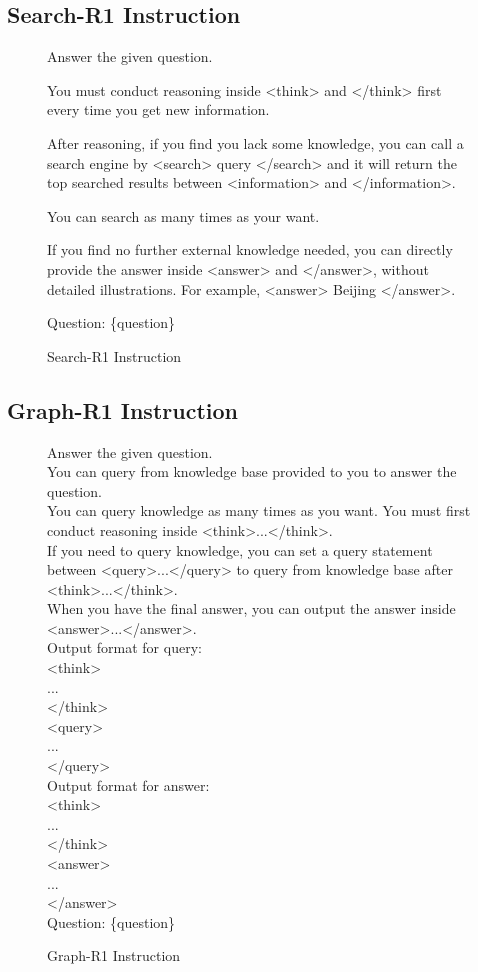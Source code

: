 \subsection{Search-R1 Instruction}
\begin{figure}[t]
\centering
\begin{tcolorbox}[mygraybox, width=\textwidth, title={Search-R1 Instruction}]
Answer the given question.

You must conduct reasoning inside <think> and </think> first every time you get new information.

After reasoning, if you find you lack some knowledge, you can call a search engine by <search> query </search> and it will return the top searched results between <information> and </information>.

You can search as many times as your want.

If you find no further external knowledge needed, you can directly provide the answer inside <answer> and </answer>, without detailed illustrations. For example, <answer> Beijing </answer>. 

Question: \{question\}
\end{tcolorbox}
\caption{Search-R1 Instruction}
\end{figure}

\subsection{Graph-R1 Instruction}
\begin{figure}[t]
\centering
\begin{tcolorbox}[mypurplebox, width=\textwidth, title={Graph-R1 Instruction},    fonttitle=\Large\bfseries]
Answer the given question. \\
You can query from knowledge base provided to you to answer the question. \\
You can query knowledge as many times as you want.
You must first conduct reasoning inside <think>...</think>. \\
If you need to query knowledge, you can set a query statement between <query>...</query> to query from knowledge base after <think>...</think>. \\
When you have the final answer, you can output the answer inside <answer>...</answer>. \\
Output format for query: \\
<think>\\
... \\
</think>\\
<query>\\
... \\
</query> \\
Output format for answer:\\
<think>\\
... \\
</think>\\
<answer>\\
... \\
</answer> \\
Question: \{question\}
\end{tcolorbox}
\caption{Graph-R1 Instruction}
\end{figure}